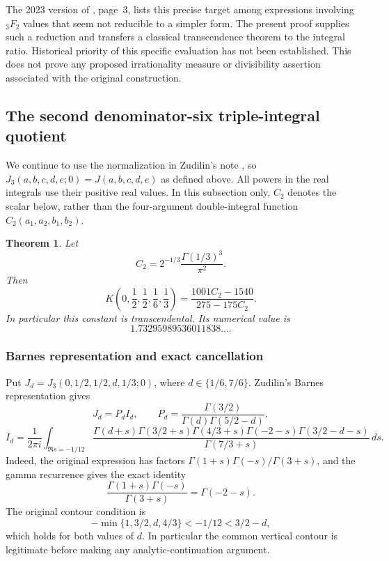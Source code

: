 \documentclass[11pt,a4paper]{article}
\newtheorem{theorem}{Theorem}[section]
\theoremstyle{definition}
\theoremstyle{remark}
\numberwithin{equation}{section}
\begin{document}
The 2023 version of \cite{extra8-zudilin}, page~3, lists this precise target
among expressions involving ${}_3F_2$ values that seem not reducible
to a simpler form. The present proof supplies such a reduction and
transfers a classical transcendence theorem to the integral ratio.
Historical priority of this specific evaluation has not been
established. This does not prove any proposed irrationality measure
or divisibility assertion associated with the original construction.


\subsection{The second denominator-six triple-integral quotient}
\label{extra8-sec:triple6b}
We continue to use the normalization in Zudilin's note \cite{extra8-zudilin},
so $J_3(a,b,c,d,e;0)=J(a,b,c,d,e)$ as defined above.
All powers in the real integrals use their positive real values.
In this subsection only, $C_2$ denotes the scalar below, rather than the
four-argument double-integral function $C_2(a_1,a_2,b_1,b_2)$.
\begin{theorem}
Let
\[
 C_2=2^{-1/3}\frac{\Gamma(1/3)^3}{\pi^2}.
\]
Then
\[
 \boxed{\displaystyle
 K\left(0,\frac12,\frac12,\frac16,\frac13\right)
 =\frac{1001C_2-1540}{275-175C_2}.}
\]
In particular this constant is transcendental. Its numerical value is
\[1.73295989536011838\ldots.\]
\end{theorem}

\subsubsection*{Barnes representation and exact cancellation}
Put $J_d=J_3(0,1/2,1/2,d,1/3;0)$, where
$d\in\{1/6,7/6\}$.  Zudilin's Barnes representation gives
\[
 J_d=P_d I_d,\qquad
 P_d=\frac{\Gamma(3/2)}{\Gamma(d)\Gamma(5/2-d)},
\]
\[
 I_d=\frac{1}{2\pi i}\int_{\Re s=-1/12}
 \frac{\Gamma(d+s)\Gamma(3/2+s)\Gamma(4/3+s)
       \Gamma(-2-s)\Gamma(3/2-d-s)}{\Gamma(7/3+s)}\,ds.
\]
Indeed, the original expression has factors
$\Gamma(1+s)\Gamma(-s)/\Gamma(3+s)$, and the gamma recurrence gives the exact identity
\[
 \frac{\Gamma(1+s)\Gamma(-s)}{\Gamma(3+s)}=\Gamma(-2-s).
\]
The original contour condition is
\[
 -\min\{1,3/2,d,4/3\}<-1/12<3/2-d,
\]
which holds for both values of $d$.  In particular the common vertical
contour is legitimate before making any analytic-continuation argument.
\end{document}
